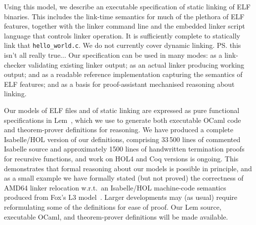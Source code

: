 \begin{verytightitemize}
\item Using this model, we describe an executable specification of static linking of ELF binaries.
This includes the link-time semantics for much of the plethora of ELF features, 
together with the linker command line and the embedded linker script language
that controls linker operation.  It is sufficiently complete to
statically link that 
\texttt{hello\_world.c}.
We do not currently cover dynamic linking.
\ps{this isn't all really true...}
Our specification can be used in many modes: 
as a link-checker validating existing linker output; 
as an actual linker producing working output; 
and as a readable reference implementation capturing the semantics of ELF features; 
and as a basis for proof-assistant mechanised reasoning about
linking. 
\end{verytightitemize}
Our models of ELF files and of static linking 
are expressed as pure functional specifications in
Lem~\cite{mulligan-lem-2014}, which we use to generate both executable
OCaml code and theorem-prover definitions for reasoning.  We have
produced a complete Isabelle/HOL version of our definitions, comprising 33\,500 lines of
commented Isabelle source and approximately 1500 lines of handwritten
termination proofs for recursive functions, and work on HOL4 and Coq
versions is ongoing.  
This demonstrates that formal reasoning about our models is possible
in principle, and as a small example we have formally stated (but not
proved) the
correctness of AMD64 linker relocation w.r.t.~an Isabelle/HOL
machine-code semantics produced from Fox's L3 model~\cite{DBLP:conf/itp/Fox15}.
Larger developments may (as usual) require
reformulating some of the definitions for ease of proof.  
Our Lem source, executable OCaml, and theorem-prover definitions will be made available. 




